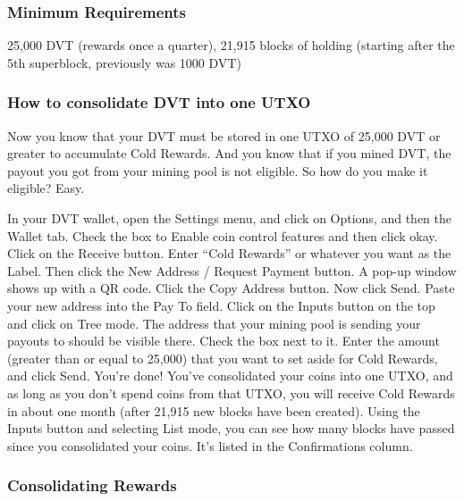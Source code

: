 \hypertarget{h.4k4endzybkr}{%
\subsubsection{\texorpdfstring{{Minimum
Requirements}}{Minimum Requirements}}\label{h.4k4endzybkr}}

{25}{,000 DVT (rewards once a quarter), 21,915 blocks of holding
(starting after the 5th superblock, previously was 1000 DVT)}

\hypertarget{h.1igpojymhxgj}{%
\subsubsection{\texorpdfstring{{How to consolidate DVT into one
UTXO}}{How to consolidate DVT into one UTXO}}\label{h.1igpojymhxgj}}

{Now you know that your DVT must be stored in one UTXO of 25,000 DVT or
greater to accumulate Cold Rewards. And you know that if you mined DVT,
the payout you got from your mining pool is not eligible. So how do you
make it eligible? Easy.}

{In your DVT wallet, open the Settings menu, and click on Options, and
then the Wallet tab. Check the box to Enable coin control features and
then click okay. Click on the Receive button. Enter ``Cold Rewards'' or
whatever you want as the Label. Then click the New Address / Request
Payment button. A pop-up window shows up with a QR code. Click the Copy
Address button. Now click Send. Paste your new address into the Pay To
field. Click on the Inputs button on the top and click on Tree mode. The
address that your mining pool is sending your payouts to should be
visible there. Check the box next to it. Enter the amount (greater than
or equal to 25,000) that you want to set aside for Cold Rewards, and
click Send. You're done! You've consolidated your coins into one UTXO,
and as long as you don't spend coins from that UTXO, you will receive
Cold Rewards in about one month (after 21,915 new blocks have been
created). Using the Inputs button and selecting List mode, you can see
how many blocks have passed since you consolidated your coins. It's
listed in the Confirmations column.}

\hypertarget{h.1x0k649ygx22}{%
\subsubsection{\texorpdfstring{{Consolidating
Rewards}}{Consolidating Rewards}}\label{h.1x0k649ygx22}}

